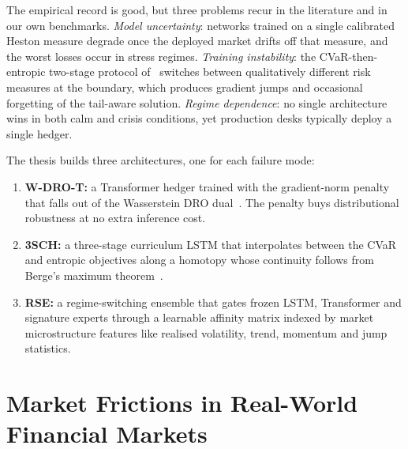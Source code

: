 \documentclass[11pt,oneside]{report}
\begin{document}
The empirical record is good, but three problems recur in the literature and in our own benchmarks. \emph{Model uncertainty}: networks trained on a single calibrated Heston measure degrade once the deployed market drifts off that measure, and the worst losses occur in stress regimes. \emph{Training instability}: the CVaR-then-entropic two-stage protocol of~\citet{kozyra2019deep} switches between qualitatively different risk measures at the boundary, which produces gradient jumps and occasional forgetting of the tail-aware solution. \emph{Regime dependence}: no single architecture wins in both calm and crisis conditions, yet production desks typically deploy a single hedger.

The thesis builds three architectures, one for each failure mode:
\begin{enumerate}[noitemsep,leftmargin=*]
    \item \textbf{W-DRO-T:} a Transformer hedger trained with the gradient-norm penalty that falls out of the Wasserstein DRO dual~\citep{blanchet2019quantifying}. The penalty buys distributional robustness at no extra inference cost.
    \item \textbf{3SCH:} a three-stage curriculum LSTM that interpolates between the CVaR and entropic objectives along a homotopy whose continuity follows from Berge's maximum theorem~\cite{berge1963topological,aliprantis2006infinite}.
    \item \textbf{RSE:} a regime-switching ensemble that gates frozen LSTM, Transformer and signature experts through a learnable affinity matrix indexed by market microstructure features like realised volatility, trend, momentum and jump statistics.
\end{enumerate}

\section{Market Frictions in Real-World Financial Markets}
\end{document}
